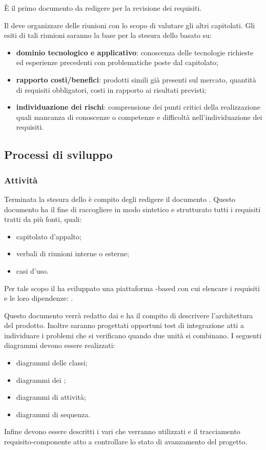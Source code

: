 \documentclass[a4paper, titlepage]{article}
\begin{document}
È il primo documento da redigere per la revisione dei requisiti.

Il  deve organizzare delle riunioni con lo scopo di valutare gli altri capitolati. Gli esiti di tali riunioni saranno la base per la stesura dello  basato su:
\begin{itemize}
	\item \textbf{dominio tecnologico e applicativo}: conoscenza delle tecnologie richieste ed esperienze precedenti con problematiche poste dal capitolato;
	\item \textbf{rapporto costi/benefici}: prodotti simili già presenti sul mercato, quantità di requisiti obbligatori, costi in rapporto ai risultati previsti;
	\item \textbf{individuazione dei rischi}: comprensione dei punti critici della realizzazione quali mancanza di conoscenze o competenze e difficoltà nell'individuazione dei requisiti.
\end{itemize}

\subsection{Processi di sviluppo}

\subsubsection{Attività}

Terminata la stesura dello  è compito degli  redigere il documento . Questo documento ha il fine di raccogliere in modo sintetico e strutturato tutti i requisiti tratti da più fonti, quali: 
\begin{itemize}
	\item capitolato d'appalto;
	\item verbali di riunioni interne o esterne;
	\item casi d'uso.
\end{itemize}

Per tale scopo il  ha sviluppato una piattaforma -based con cui elencare i requisiti e le loro dipendenze: .

Questo documento verrà redatto dai  e ha il compito di descrivere l'architettura del prodotto. Inoltre saranno progettati opportuni test di integrazione atti a individuare i problemi che si verificano quando due unità si combinano.
I seguenti diagrammi  devono essere realizzati:
\begin{itemize}
	\item diagrammi delle classi;
	\item diagrammi dei ;
	\item diagrammi di attività;
	\item diagrammi di sequenza.
\end{itemize}
Infine devono essere descritti i vari  che verranno utilizzati e il tracciamento requisito-componente atto a controllare lo stato di avanzamento del progetto.
\end{document}
